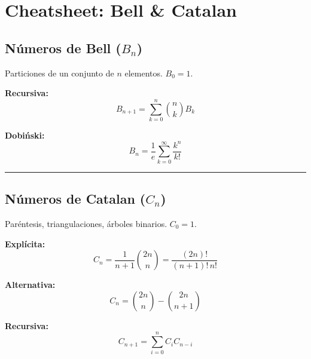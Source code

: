 \documentclass[10pt,landscape,twocolumn]{article}
\begin{document}
\section*{Cheatsheet: Bell \& Catalan}

\subsection*{Números de Bell ($B_n$)}
Particiones de un conjunto de $n$ elementos. $B_0=1$.

\textbf{Recursiva:}
$$ B_{n+1} = \sum_{k=0}^{n} \binom{n}{k} B_k $$

\textbf{Dobiński:}
$$ B_n = \frac{1}{e} \sum_{k=0}^{\infty} \frac{k^n}{k!} $$

\rule{\linewidth}{0.2pt}

\subsection*{Números de Catalan ($C_n$)}
Paréntesis, triangulaciones, árboles binarios. $C_0=1$.

\textbf{Explícita:}
$$ C_n = \frac{1}{n+1} \binom{2n}{n} = \frac{(2n)!}{(n+1)!\,n!} $$

\textbf{Alternativa:}
$$ C_n = \binom{2n}{n} - \binom{2n}{n+1} $$

\textbf{Recursiva:}
$$ C_{n+1} = \sum_{i=0}^{n} C_i C_{n-i} $$
\end{document}
